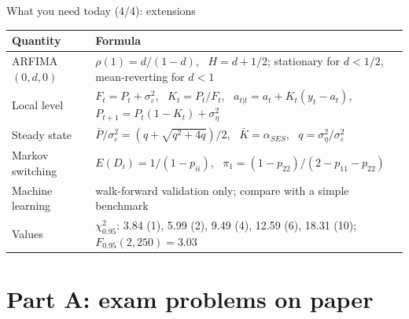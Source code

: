 \begin{frame}{What you need today (4/4): extensions}
\itemsize{\small}
{\renewcommand{\arraystretch}{1.3}\begin{center}
\footnotesize
\begin{tabular}{l>{\raggedright\arraybackslash}p{9.4cm}}
\toprule
\textbf{Quantity} & \textbf{Formula} \\
\midrule
ARFIMA$(0,d,0)$ & $\rho(1) = d/(1 - d)$, \ $H = d + 1/2$; stationary for $d < 1/2$, mean-reverting for $d < 1$ \\
Local level & $F_t = P_t + \sigma^2_\varepsilon$, \ $K_t = P_t/F_t$, \ $a_{t|t} = a_t + K_t(y_t - a_t)$, \ $P_{t+1} = P_t(1 - K_t) + \sigma^2_\eta$ \\
Steady state & $\bar P/\sigma^2_\varepsilon = (q + \sqrt{q^2 + 4q})/2$, \ $\bar K = \alpha_{SES}$, \ $q = \sigma^2_\eta/\sigma^2_\varepsilon$ \\
Markov switching & $E(D_i) = 1/(1 - p_{ii})$, \ $\pi_1 = (1 - p_{22})/(2 - p_{11} - p_{22})$ \\
Machine learning & walk-forward validation only; compare with a simple benchmark \\
Values & $\chi^2_{0.95}$: 3.84 (1), 5.99 (2), 9.49 (4), 12.59 (6), 18.31 (10); \ $F_{0.95}(2, 250) = 3.03$ \\
\bottomrule
\end{tabular}
\end{center}
}
\end{frame}


\section{Part A: exam problems on paper}

